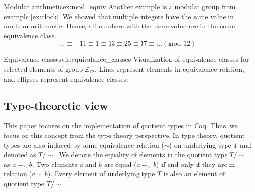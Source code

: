 \begin{example}{Modular arithmetic}{ex:mod_equiv}
Another example is a modular group from example \ref{ex:clock}. We showed that multiple integers have the same value in modular arithmetic. Hence, all numbers with the same value are in the same equivalence class.
$$ \dots \equiv -11 \equiv 1 \equiv 13 \equiv 25 \equiv 37 \equiv \dots (\textrm{mod } 12) $$
\end{example}
\begin{vis}[G]{Equivalence classes}{vis:equivalance_classes}
Visualization of equivalence classes for selected elements of group $\mathbb{Z}_{12}$. Lines represent elements in equivalence relation, and ellipses represent equivalence classes:
\begin{center}
\end{center}
\end{vis}

\subsection{Type-theoretic view}
This paper focuses on the implementation of quotient types in Coq. Thus, we focus on this concept from the type theory perspective. In type theory, quotient types are also induced by some equivalence relation ($\sim$) on underlying type $T$ and denoted as $T/\sim$. We denote the equality of elements in the quotient type $T/\sim$ as $a =_\sim b$. Two elements $a$ and $b$ are equal ($a =_\sim b$) if and only if they are in relation ($a \sim b$). Every element of underlying type $T$ is also an element of quotient type $T/\sim$.

